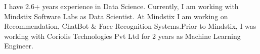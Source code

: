 
\begin{cvparagraph}
I have 2.6+ years experience in Data Science. Currently, I am working with Mindstix Software Labs as Data Scientist. At Mindstix I am working on Recommendation, ChatBot \& Face Recognition Systems.\newline Prior to Mindstix, I was working with Coriolis Technologies Pvt Ltd for 2 years as Machine Learning Engineer.
\end{cvparagraph}
